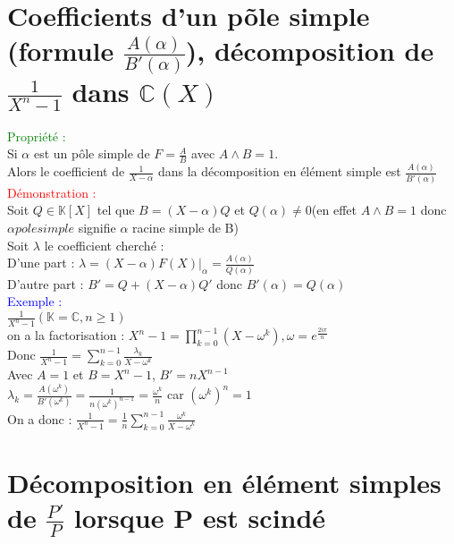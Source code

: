 \documentclass{article}
\begin{document}
\section{Coefficients d'un põle simple (formule $\frac{A(\alpha)}{B'(\alpha)}$), décomposition de $\frac{1}{X^n-1}$ dans $\mathbb{C}(X)$}
\textcolor{green}{Propriété :} \\
Si $\alpha$ est un pôle simple de $F= \frac{A}{B}$ avec $A \wedge B=1$. \\
Alors le coefficient de $\frac{1}{X-\alpha}$ dans la décomposition en élément simple est $\frac{A(\alpha)}{B'(\alpha)}$ \\
\textcolor{red}{Démonstration :} \\
Soit $Q \in \mathbb K [X]$ tel que $B=(X-\alpha)Q$ et $Q(\alpha) \neq 0$(en effet $A \wedge B =1$ donc $\alpha pole simple$ signifie $\alpha$ racine simple de B) \\
Soit $ \lambda$ le coefficient cherché : \\
D'une part : $\lambda=(X-\alpha)F(X)|_{\alpha}= \frac{A(\alpha)}{Q(\alpha)}$  \\
D'autre part : $B'=Q+(X-\alpha)Q'$ donc $B'(\alpha)=Q(\alpha)$ \\
\textcolor{blue}{Exemple :} \\
$\frac{1}{X^n-1}(\mathbb K = \mathbb C, n \geq 1)$ \\
on a la factorisation : $X^n-1=\prod_{k=0}^{n-1}(X-\omega^k), \omega=e^{\frac{2i\pi}{n}}$ \\
Donc $\frac{1}{X^n-1}= \sum_{k=0}^{n-1} \frac{\lambda_k}{X-\omega^k}$ \\
Avec $A=1$ et $B=X^n-1$, $B'=nX^{n-1}$ \\
$\lambda_k=\frac{A(\omega^k)}{B'(\omega^k)}=\frac{1}{n(\omega^k)^{n-1}}=\frac{\omega^k}{n}$ car $(\omega^k)^n=1$ \\
On a donc : $\frac{1}{X^n-1}=\frac{1}{n}\sum^{n-1}_{k=0}\frac{\omega^k}{X-\omega^k}$
\section{Décomposition en élément simples de $\frac{P'}{P}$ lorsque P est scindé}
\end{document}
